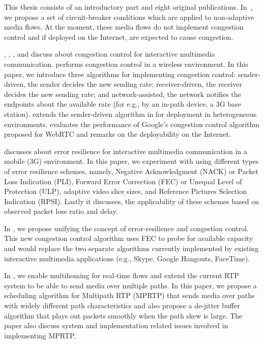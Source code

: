 This thesis consists of an introductory part and eight original publications.
In~, we propose a set of circuit-breaker conditions which are
applied to non-adaptive media flows. At the moment, these media flows do not
implement congestion control and if deployed on the Internet, are expected to
cause congestion.

, , , and 
discuss about congestion control for interactive multimedia communication.
 performs congestion control in a wireless environment. In
this paper, we introduce three algorithms for implementing congestion control:
sender-driven, the sender decides the new sending rate; receiver-driven, the
receiver decides the new sending rate; and network-assisted, the network
notifies the endpoints about the available rate (for e.g., by an in-path
device, a 3G base station).  extends the sender-driven
algorithm in  for deployment in heterogeneous environments.
 evaluates the performance of Google's congestion control
algorithm proposed for WebRTC and remarks on the deployability on the
Internet.

 discusses about error resilience for interactive multimedia
communication in a mobile (3G) environment. In this paper, we experiment with
using different types of error resilience schemes, namely, Negative
Acknowledgment (NACK) or Packet Loss Indication (PLI), Forward Error
Correction (FEC) or Unequal Level of Protection (ULP), adaptive video slice
sizes, and Reference Pictures Selection Indication (RPSI). Lastly it
discusses, the applicability of these schemes based on observed packet loss
ratio and delay.

In , we propose unifying the concept of error-resilience and
congestion control. This new congestion control algorithm uses FEC to probe
for available capacity and would replace the two separate algorithms currently
implemented by existing interactive multimedia applications (e.g., Skype,
Google Hangouts, FaceTime).


In , we enable multihoming for real-time flows and extend the
current RTP system to be able to send media over multiple paths. In this
paper, we propose a scheduling algorithm for Multipath RTP (MPRTP) that sends
media over paths with widely different path characteristics and also propose a
de-jitter buffer algorithm that plays out packets smoothly when the path skew
is large. The paper also discuss system and implementation related issues
involved in implementing MPRTP.

